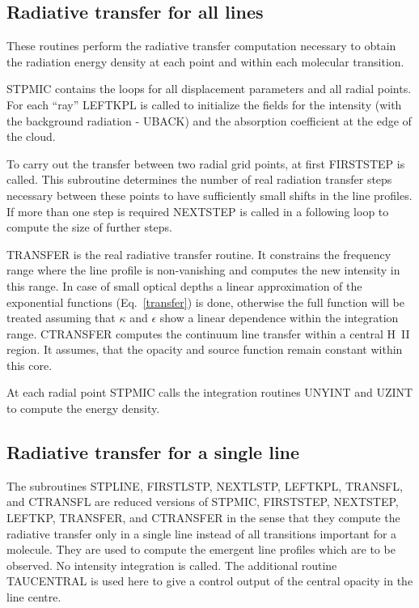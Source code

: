 \subsection{Radiative transfer for all lines}

These routines perform the radiative transfer computation
necessary to obtain the radiation energy density at each
point and within each molecular transition.

STPMIC contains the loops for all displacement parameters
and all radial points. For each ``ray'' LEFTKPL is called
to initialize the fields for the intensity (with the background
radiation - UBACK) and the absorption coefficient 
at the edge of the cloud.

To carry out the transfer between two radial grid
points, at first FIRSTSTEP is called. This subroutine determines
the number of real radiation transfer steps necessary between
these points to have sufficiently small shifts in the line profiles.
If more than one step is required NEXTSTEP is called in a following loop
to compute the size of further steps.

TRANSFER is the real radiative transfer routine. It constrains
the frequency range where the line profile is non-vanishing
and computes the new intensity in this range. In case of small
optical depths a linear approximation of the exponential functions
(Eq.\ \ref{transfer}) is done, otherwise the full function will
be treated assuming that $\kappa$ and $\epsilon$ show a linear
dependence within the integration range. CTRANSFER computes
the continuum line transfer within a central H~II region. It assumes,
that the opacity and source function remain constant within this core. 

At each radial point STPMIC calls the integration routines
UNYINT and UZINT to compute the energy density.

\subsection{Radiative transfer for a single line}

The subroutines STPLINE, FIRSTLSTP, NEXTLSTP, LEFTKPL, TRANSFL, and
CTRANSFL are reduced versions of STPMIC, FIRSTSTEP, NEXTSTEP, LEFTKP, 
TRANSFER, and CTRANSFER in the sense that they compute the radiative transfer
only in a single line instead of all transitions important for a 
molecule. They are used to compute the emergent line profiles
which are to be observed. No intensity integration is called.
The additional routine TAUCENTRAL is used here to give a control
output of the central opacity in the line centre. 

